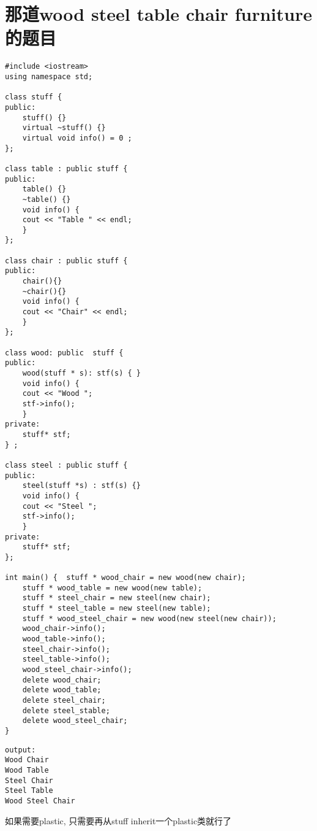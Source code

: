 \documentclass[12pt]{book}
\begin{document}
\section{那道wood steel table chair furniture的题目}
\label{sec-18-1}
\lstset{language=java,label= ,caption= ,numbers=none}
\begin{lstlisting}
#include <iostream>
using namespace std;

class stuff {
public:
    stuff() {}
    virtual ~stuff() {}
    virtual void info() = 0 ;
};

class table : public stuff {
public:
    table() {}
    ~table() {}
    void info() {
	cout << "Table " << endl;
    }
};

class chair : public stuff {
public:
    chair(){}
    ~chair(){}
    void info() {
	cout << "Chair" << endl;
    }
};

class wood: public  stuff {
public:
    wood(stuff * s): stf(s) { }
    void info() {
	cout << "Wood ";
	stf->info();
    }
private:
    stuff* stf;
} ;

class steel : public stuff {
public:
    steel(stuff *s) : stf(s) {}
    void info() {
	cout << "Steel ";
	stf->info();
    }
private:
    stuff* stf;
};

int main() {  stuff * wood_chair = new wood(new chair); 
    stuff * wood_table = new wood(new table); 
    stuff * steel_chair = new steel(new chair); 
    stuff * steel_table = new steel(new table); 
    stuff * wood_steel_chair = new wood(new steel(new chair)); 
    wood_chair->info(); 
    wood_table->info(); 
    steel_chair->info(); 
    steel_table->info(); 
    wood_steel_chair->info(); 
    delete wood_chair; 
    delete wood_table; 
    delete steel_chair; 
    delete steel_stable; 
    delete wood_steel_chair; 
}
\end{lstlisting}

\lstset{language=java,label= ,caption= ,numbers=none}
\begin{lstlisting}
output:
Wood Chair
Wood Table 
Steel Chair
Steel Table 
Wood Steel Chair
\end{lstlisting}

如果需要plastic, 只需要再从stuff inherit一个plastic类就行了
\end{document}
